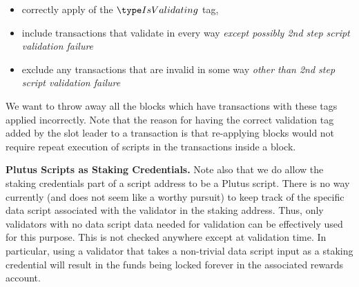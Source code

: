 \begin{itemize}
  \item correctly apply of the $\IsValidating$ tag,
  \item include transactions that validate in every way
  \textit{except possibly 2nd step script validation failure}
  \item exclude any transactions that are invalid
in some way \textit{other than 2nd step script validation failure}
\end{itemize}

We want to
throw away all the blocks which have transactions with these tags
applied incorrectly.
Note that the reason for having the correct validation tag added by the slot leader
to a transaction is that re-applying blocks would not require repeat
execution of scripts in the transactions inside a block.

\textbf{Plutus Scripts as Staking Credentials.}
Note also that we do allow the staking credentials part of a script
address to be a Plutus script. There is no way currently (and does not seem
like a worthy pursuit) to keep track of the specific data script associated with
the validator in the staking address. Thus, only validators with no
data script data needed for validation can be effectively used for this purpose.
This is not checked anywhere except at validation time. In particular,
using a validator that takes a non-trivial data script input as a staking credential
will result in the funds being locked forever in the associated rewards account.

